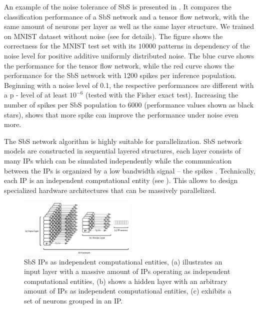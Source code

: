An example of the noise tolerance of SbS is presented in
. It compares the classification performance of
a SbS network and a tensor flow network, with the same amount of
neurons per layer as well as the same layer structure. We trained on MNIST dataset\cite{lecun1998mnist} without noise (see \cite{rotermund2019Backpropagation} for details). The figure shows the correctness for the MNIST test set with its $10000$ patterns in dependency of the noise level for positive additive
uniformly distributed noise. The blue curve shows the performance for
the tensor flow network, while the red curve shows the performance for
the SbS network with 1200 spikes per inference population. Beginning
with a noise level of 0.1, the respective performances are different
with a p - level of at least $10^{-6}$ (tested with the Fisher exact
test). Increasing the number of spikes per SbS population to 6000
(performance values shown as black stars), shows that more spike can
improve the performance under noise even more.

The SbS network algorithm is highly suitable for parallelization. SbS network models are constructed in sequential layered structures, each layer consists of many IPs which can be simulated independently while the communication between the IPs is organized by a low bandwidth signal -- the spikes \cite{Rotermund500280}. Technically, each IP is an independent computational entity (see ). This allows to design specialized hardware architectures that can be massively parallelized.

\begin{figure}
	\centering
	\includegraphics[width=0.5\textwidth]{../figures/SbS_layer.pdf}
	\caption{SbS IPs as independent computational entities, (a) illustrates an input layer with a massive amount of IPs operating as independent computational entities, (b) shows a hidden layer with an arbitrary amount of IPs as independent computational entities, (c) exhibits a set of neurons grouped in an IP. }
	\label{fig:SbS_layer}
\end{figure}
